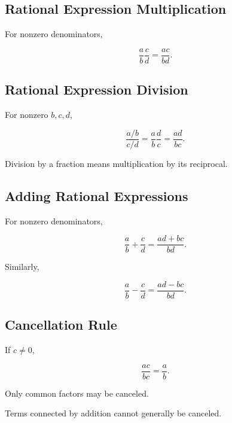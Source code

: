 \subsection{Rational Expression Multiplication}
\label{subsec:rational-expression-multiplication}

For nonzero denominators,

\[
\boxed{
\frac{a}{b}
\frac{c}{d}
=
\frac{ac}{bd}.
}
\]

\subsection{Rational Expression Division}
\label{subsec:rational-expression-division}

For nonzero \(b,c,d\),

\[
\boxed{
\frac{a/b}{c/d}
=
\frac{a}{b}
\frac{d}{c}
=
\frac{ad}{bc}.
}
\]

Division by a fraction means multiplication by its reciprocal.

\subsection{Adding Rational Expressions}
\label{subsec:rational-expression-addition}

For nonzero denominators,

\[
\boxed{
\frac{a}{b}
+
\frac{c}{d}
=
\frac{ad+bc}{bd}.
}
\]

Similarly,

\[
\boxed{
\frac{a}{b}
-
\frac{c}{d}
=
\frac{ad-bc}{bd}.
}
\]

\subsection{Cancellation Rule}
\label{subsec:cancellation-rule}

If \(c\neq0\),

\[
\boxed{
\frac{ac}{bc}
=
\frac{a}{b}.
}
\]

Only common factors may be canceled.

Terms connected by addition cannot generally be canceled.

